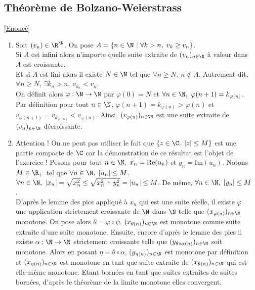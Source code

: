 \documentclass{book}
\begin{document}
	\subsection{Théorème de Bolzano-Weierstrass }
	\label{sec:theoreme-de-bolzano-weierstrass-etoile3}
	\textcolor{blue}{\hyperref[Théorème de Bolzano-Weierstrass]{[Enoncé]}}\\
	\begin{enumerate}[leftmargin=*]
		\item Soit $(v_n)\in \R^\N$. On pose $A=\{n\in \N\ |\ \forall k>n,\ v_k\geq v_n\}$.\\
		Si $A$ est infini alors n'importe quelle suite extraite de $(v_n)_{n\in \N}$ à valeur dans $A$ est croissante.\\
		Et si $A$ est fini alors il existe $N\in \N$ tel que $\forall n\geq N,\ n\notin A$. Autrement dit, $\forall n\geq N,\ \exists k_n>n,\ v_{k_n}<v_n$.\\
		On définit alors $\varphi:\N\to \N$ par $\varphi(0)=N$ et $\forall n\in \N,\ \varphi(n+1)=k_{\varphi(n)}$.\\
		Par définition pour tout $n\in \N$, $\varphi(n+1)=k_{\varphi(n)}>\varphi(n)$ et $v_{\varphi(n+1)}=v_{k_{\varphi(n)}}<v_{\varphi(n)}$. Ainsi, $(v_{\varphi(n)})_{n\in \N}$ est une suite extraite de $(v_n)_{n\in \N}$ décroissante.
		\item Attention ! On ne peut pas utiliser le fait que $\{z\in \C,\ |z|\leq M\}$ est une partie compacte de $\C$ car la démonstration de ce résultat est l'objet de l'exercice !
		Posons pour tout $n\in \N,\ x_n=\text{Re}(u_n)$ et $y_n=\text{Im}(u_n)$. Notons $M\in \R_+$ tel que $\forall n\in \N,\ |u_n|\leq M$.\\
		$\forall n\in \N,\ \displaystyle|x_n|=\sqrt{x_n^2}\leq \sqrt{x_n^2+y_n^2}=|u_n|\leq M$. De même, $\forall n\in \N,\ |y_n|\leq M$.\\
		D'après le lemme des pics appliqué à $x_n$ qui est une suite réelle, il existe  $\varphi$ une application strictement croissante de $\N$ dans $\N$ telle que $(x_{\varphi(n)})_{n\in \N}$ monotone. On pose alors $\theta=\varphi\circ\psi$. $(x_{\theta(n)})_{n\in \N}$ est monotone comme suite extraite d'une suite monotone. Ensuite, encore d'après le lemme des pics il existe $\alpha:\N\to \N$ strictement croissante telle que $(y_{\theta\circ\alpha(n)})_{n\in \N}$ soit monotone. Alors en posant $\eta=\theta\circ\alpha$, $(y_{\eta(n)})_{n\in \N}$ est monotone par définition et $(x_{\eta(n)})_{n\in \N}$ est monotone en tant que suite extraite de $(x_{\theta(n)})_{n\in \N}$ qui est elle-même monotone. Etant bornées en tant que suites extraites de suites bornées, d'après le théorème de la limite monotone elles convergent.\\

\end{enumerate}
\end{document}
